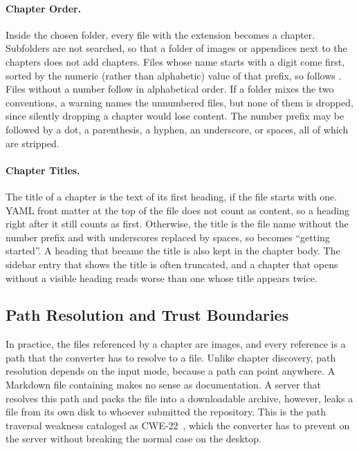 \paragraph{Chapter Order.}
\label{sec:in_order}
Inside the chosen folder, every file with the extension  becomes a chapter.
Subfolders are not searched, so that a folder of images or appendices next to the chapters does not
add chapters.
Files whose name starts with a digit come first, sorted by the numeric (rather than alphabetic) value of that prefix,
so  follows .
Files without a number follow in alphabetical order.
If a folder mixes the two conventions, a warning names the unnumbered files, but none of them is
dropped, since silently dropping a chapter would lose content.
The number prefix may be followed by a dot, a parenthesis, a hyphen, an underscore, or spaces, all of
which are stripped.

\paragraph{Chapter Titles.}
The title of a chapter is the text of its first heading, if the file starts with one.
YAML front matter at the top of the file does not count as content, so a heading right after it
still counts as first.
Otherwise, the title is the file name without the number prefix and with underscores replaced by
spaces, so  becomes ``getting started''.
A heading that became the title is also kept in the chapter body.
The sidebar entry that shows the title is often truncated, and a chapter that opens without a
visible heading reads worse than one whose title appears twice.

\subsection{Path Resolution and Trust Boundaries}
\label{sec:files_paths}


In practice, the files referenced by a chapter are images, and every reference is a path that the converter has to resolve to a file.
Unlike chapter discovery, path resolution depends on the input mode, because a path can point anywhere.
A Markdown file containing \allowbreak{} makes no sense as documentation.
A server that resolves this path and packs the file into a downloadable archive, however, leaks a
file from its own disk to whoever submitted the repository.
This is the path traversal weakness cataloged as CWE-22~\cite{MITRE:CWE22}, which the converter has
to prevent on the server without breaking the normal case on the desktop.

